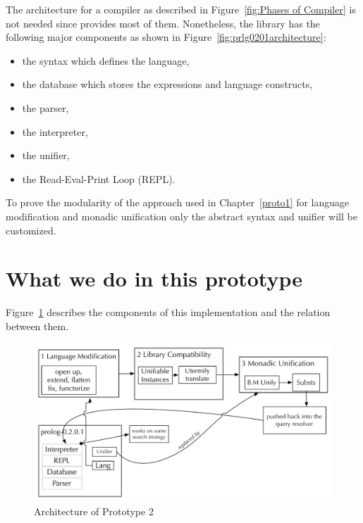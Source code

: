 \documentclass[thesis-solanki.tex]{subfiles}
\begin{document}
The architecture for a compiler as described in Figure~\ref{fig:Phases of Compiler} is not needed since
 provides most of them.
Nonetheless, the library has the following major components as shown in Figure~\ref{fig:prlg0201architecture}:

\begin{itemize}
\item the syntax which defines the language,

\item the database which stores the expressions and language constructs,

\item the parser,

\item the interpreter,

\item the unifier,

\item the Read-Eval-Print Loop (REPL).
\end{itemize}

To prove the modularity of the approach used in Chapter~\ref{proto1} for language modification and monadic
unification only the abstract syntax and unifier will be customized.

\section{What we do in this prototype}

Figure~\ref{fig:architecture-proto-2} describes the components of this implementation and the relation between
them.

\begin{figure}[H]
  \includegraphics[width=1\textwidth]{Prototype-2-diagram.pdf}
\vspace*{-1cm}
  \caption{Architecture of Prototype 2}
  \label{fig:architecture-proto-2}
\end{figure}
\end{document}
